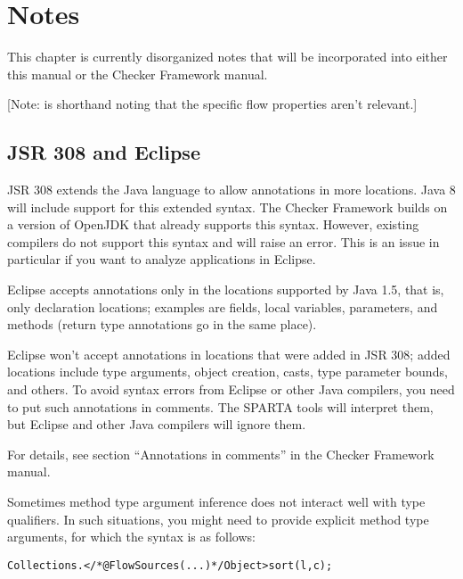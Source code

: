 \htmlhr
\chapter{Notes\label{notes}}

This chapter is currently disorganized notes that will be incorporated into
either this manual or the Checker Framework manual.

[Note: \srcsome{} is shorthand noting that the specific flow
properties aren't relevant.]


\section{JSR 308 and Eclipse\label{sec:jsr308}}

JSR 308 extends the Java language to allow annotations in more
locations. Java 8 will include support for this extended syntax.
The Checker Framework builds on a version of OpenJDK that already
supports this syntax.
However, existing compilers do not support this syntax and will raise
an error. This is an issue in particular if you want to analyze
applications in Eclipse.

Eclipse accepts annotations only in the locations supported by Java
1.5, that is, only declaration locations; examples are fields, local
variables, parameters, and methods (return type annotations go in the same
place).

Eclipse won't accept annotations in locations that were added in
JSR 308; added locations include type arguments, object creation,
casts, type parameter bounds, and others.
To avoid syntax errors from Eclipse or other Java compilers, you need
to put such annotations in comments.
The SPARTA tools will interpret them, but Eclipse and other Java compilers
will ignore them.

For details, see section ``Annotations in comments'' in the Checker Framework manual.



Sometimes method type argument inference does not interact well with
type qualifiers. In such situations, you might need to provide
explicit method type arguments, for which the syntax is as follows:

\begin{alltt}
	Collections.</*@FlowSources({...})*/ Object>sort(l, c);
\end{alltt}


